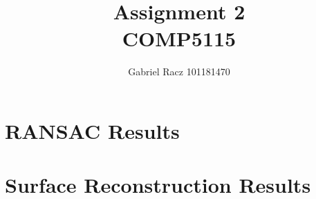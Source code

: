 \documentclass{article}
\title{%
    Assignment 2 \\
    \Large COMP5115}
\author{%
    Gabriel Racz 101181470
   }
\begin{document}
\maketitle
\pagebreak
\section{RANSAC Results}
\section{Surface Reconstruction Results}
\end{document}
